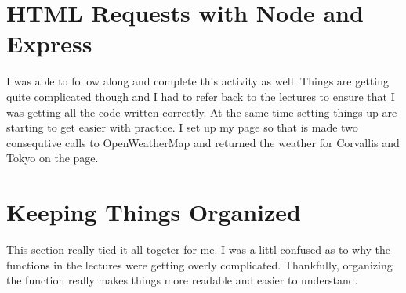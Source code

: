 \documentclass{article}
\begin{document}
\section*{HTML Requests with Node and Express}
I was able to follow along and complete this activity as well. Things are getting quite complicated though and I had to refer back to the lectures to ensure that I was getting all the code written correctly. At the same time setting things up are starting to get easier with practice. I set up my page so that is made two consequtive calls to OpenWeatherMap and returned the weather for Corvallis and Tokyo on the page. 

\section*{Keeping Things Organized}
This section really tied it all togeter for me. I was a littl confused as to why the functions in the lectures were getting overly complicated. Thankfully, organizing the function really makes things more readable and easier to understand. 
\end{document}
